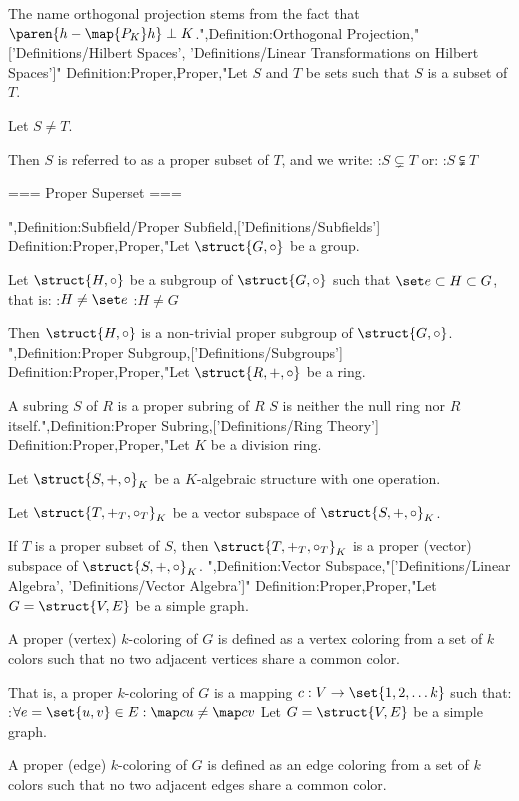 The name orthogonal projection stems from the fact that $\paren {h - \map {P_K} h} \perp K$.",Definition:Orthogonal Projection,"['Definitions/Hilbert Spaces', 'Definitions/Linear Transformations on Hilbert Spaces']"
Definition:Proper,Proper,"Let $S$ and $T$ be sets such that $S$ is a subset of $T$.

Let $S \ne T$.

Then $S$ is referred to as a proper subset of $T$, and we write:
:$S \subsetneq T$
or:
:$S \subsetneqq T$


=== Proper Superset ===

",Definition:Subfield/Proper Subfield,['Definitions/Subfields']
Definition:Proper,Proper,"Let $\struct {G, \circ}$ be a group.

Let $\struct {H, \circ}$ be a subgroup of $\struct {G, \circ}$ such that $\set e \subset H \subset G$, that is:
:$H \ne \set e$
:$H \ne G$

Then $\struct {H, \circ}$ is a non-trivial proper subgroup of $\struct {G, \circ}$.
",Definition:Proper Subgroup,['Definitions/Subgroups']
Definition:Proper,Proper,"Let $\struct {R, +, \circ}$ be a ring.


A subring $S$ of $R$ is a proper subring of $R$  $S$ is neither the null ring nor $R$ itself.",Definition:Proper Subring,['Definitions/Ring Theory']
Definition:Proper,Proper,"Let $K$ be a division ring.

Let $\struct {S, +, \circ}_K$ be a $K$-algebraic structure with one operation.

Let $\struct {T, +_T, \circ_T}_K$ be a vector subspace of $\struct {S, +, \circ}_K$.


If $T$ is a proper subset of $S$, then $\struct {T, +_T, \circ_T}_K$ is a proper (vector) subspace of $\struct {S, +, \circ}_K$.
",Definition:Vector Subspace,"['Definitions/Linear Algebra', 'Definitions/Vector Algebra']"
Definition:Proper,Proper,"Let $G = \struct {V, E}$ be a simple graph.


A proper (vertex) $k$-coloring of $G$ is defined as a vertex coloring from a set of $k$ colors such that no two adjacent vertices share a common color.

That is, a proper $k$-coloring of $G$ is a mapping $c: V \to \set {1, 2, \ldots k}$ such that:
:$\forall e = \set {u, v} \in E: \map c u \ne \map c v$
Let $G = \struct {V, E}$ be a simple graph.


A proper (edge) $k$-coloring of $G$ is defined as an edge coloring from a set of $k$ colors such that no two adjacent edges share a common color.

